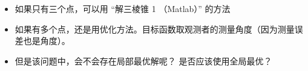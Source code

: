 
\begin{issues}
\issueDraft
\end{issues}

\begin{itemize}
\item 如果只有三个点，可以用 “解三棱锥 1 （Matlab）” 的方法
\item 如果有多个点，还是用优化方法。目标函数取观测者的测量角度（因为测量误差也是角度）。
\item 但是该问题中，会不会存在局部最优解呢？ 是否应该使用全局最优？
\end{itemize}
